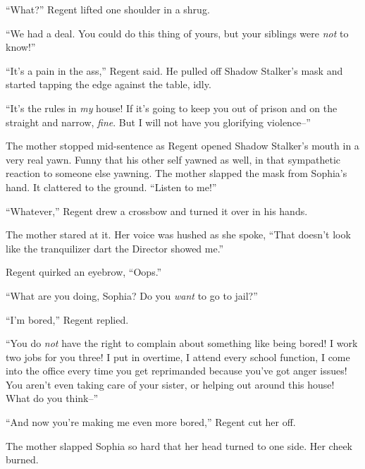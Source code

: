 ``What?'' Regent lifted one shoulder in a shrug.



``We had a deal.  You could do this thing of yours, but your siblings were \emph{not} to know!''



``It's a pain in the ass,'' Regent said.  He pulled off Shadow Stalker's mask and started tapping the edge against the table, idly.



``It's the rules in \emph{my} house!  If it's going to keep you out of prison and on the straight and narrow, \emph{fine}.  But I will not have you glorifying violence--''



The mother stopped mid-sentence as Regent opened Shadow Stalker's mouth in a very real yawn.  Funny that his other self yawned as well, in that sympathetic reaction to someone else yawning.  The mother slapped the mask from Sophia's hand.  It clattered to the ground.  ``Listen to me!''



``Whatever,'' Regent drew a crossbow and turned it over in his hands.



The mother stared at it.  Her voice was hushed as she spoke, ``That doesn't look like the tranquilizer dart the Director showed me.''



Regent quirked an eyebrow, ``Oops.''



``What are you doing, Sophia?  Do you \emph{want} to go to jail?''



``I'm bored,'' Regent replied.



``You do \emph{not} have the right to complain about something like being bored!  I work two jobs for you three!  I put in overtime, I attend every school function, I come into the office every time you get reprimanded because you've got anger issues!  You aren't even taking care of your sister, or helping out around this house!  What do you think--''



``And now you're making me even more bored,'' Regent cut her off.



The mother slapped Sophia so hard that her head turned to one side.  Her cheek burned.



